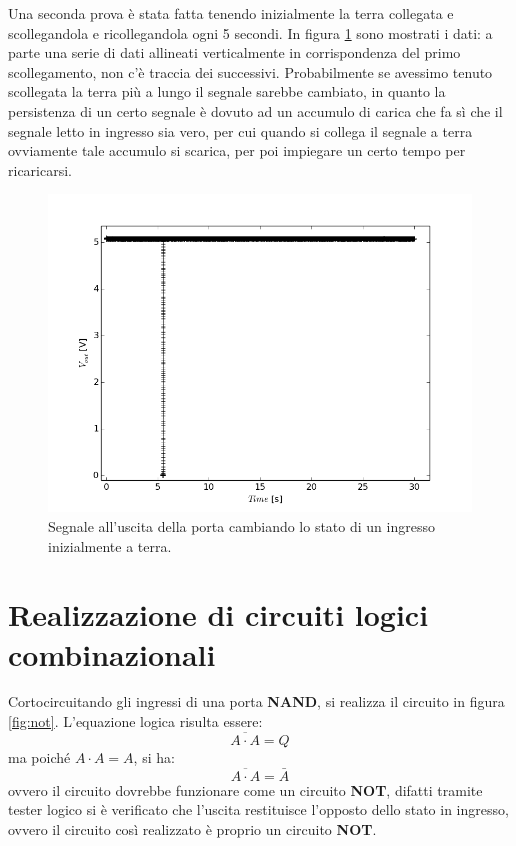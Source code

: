 \documentclass[journal, a4paper]{IEEEtran}
\begin{document}
Una seconda prova è stata fatta tenendo inizialmente la terra collegata e scollegandola e ricollegandola ogni 5 secondi. In figura \ref{fig:es83} sono mostrati i dati: a parte una serie di dati allineati verticalmente in corrispondenza del primo scollegamento, non c'è traccia dei successivi. Probabilmente se avessimo tenuto scollegata la terra più a lungo il segnale sarebbe cambiato, in quanto la persistenza di un certo segnale è dovuto ad un accumulo di carica che fa sì che il segnale letto in ingresso sia vero, per cui quando si collega il segnale a terra ovviamente tale accumulo si scarica, per poi impiegare un certo tempo per ricaricarsi.

\begin{figure}[htp]
\centering
\includegraphics[scale=.4]{es8_falso-veroboh}
\caption{Segnale all'uscita della porta cambiando lo stato di un ingresso inizialmente a terra.}
\label{fig:es83}
\end{figure}

\section{Realizzazione di circuiti logici combinazionali}

Cortocircuitando gli ingressi di una porta \textbf{NAND}, si realizza il circuito in figura \ref{fig:not}. L'equazione logica risulta essere:
\begin{equation}
\overline{A \cdot A} = Q
\end{equation}
ma poiché $A \cdot A = A$, si ha:
\begin{equation}
\overline{A \cdot A} =\bar{A}
\end{equation}
ovvero il circuito dovrebbe funzionare come un circuito \textbf{NOT}, difatti tramite tester logico si è verificato che l'uscita restituisce l'opposto dello stato in ingresso, ovvero il circuito così realizzato è proprio un circuito \textbf{NOT}.  
\end{document}
